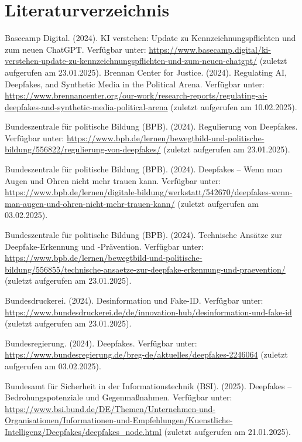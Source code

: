 \documentclass[a4paper,12pt]{article}
\begin{document}
\section*{Literaturverzeichnis}
\begin{thebibliography}{99}
 Basecamp Digital. (2024). KI verstehen: Update zu Kennzeichnungspflichten und zum neuen ChatGPT.
Verfügbar unter: \url{https://www.basecamp.digital/ki-verstehen-update-zu-kennzeichnungspflichten-und-zum-neuen-chatgpt/} (zuletzt aufgerufen am 23.01.2025).
 Brennan Center for Justice. (2024). Regulating AI, Deepfakes, and Synthetic Media in the Political Arena.  
Verfügbar unter: \url{https://www.brennancenter.org/our-work/research-reports/regulating-ai-deepfakes-and-synthetic-media-political-arena} (zuletzt aufgerufen am 10.02.2025).

 Bundeszentrale für politische Bildung (BPB). (2024). Regulierung von Deepfakes. 
Verfügbar unter: \url{https://www.bpb.de/lernen/bewegtbild-und-politische-bildung/556822/regulierung-von-deepfakes/} (zuletzt aufgerufen am 23.01.2025).

 Bundeszentrale für politische Bildung (BPB). (2024). Deepfakes – Wenn man Augen und Ohren nicht mehr trauen kann. 
Verfügbar unter: \url{https://www.bpb.de/lernen/digitale-bildung/werkstatt/542670/deepfakes-wenn-man-augen-und-ohren-nicht-mehr-trauen-kann/} (zuletzt aufgerufen am 03.02.2025).

 Bundeszentrale für politische Bildung (BPB). (2024). Technische Ansätze zur Deepfake-Erkennung und -Prävention. 
Verfügbar unter: \url{https://www.bpb.de/lernen/bewegtbild-und-politische-bildung/556855/technische-ansaetze-zur-deepfake-erkennung-und-praevention/} (zuletzt aufgerufen am 23.01.2025).

 Bundesdruckerei. (2024). Desinformation und Fake-ID. 
Verfügbar unter: \url{https://www.bundesdruckerei.de/de/innovation-hub/desinformation-und-fake-id} (zuletzt aufgerufen am 23.01.2025).

 Bundesregierung. (2024). Deepfakes. 
Verfügbar unter: \url{https://www.bundesregierung.de/breg-de/aktuelles/deepfakes-2246064} (zuletzt aufgerufen am 03.02.2025).

 Bundesamt für Sicherheit in der Informationstechnik (BSI). (2025). Deepfakes – Bedrohungspotenziale und Gegenmaßnahmen. 
Verfügbar unter: \url{https://www.bsi.bund.de/DE/Themen/Unternehmen-und-Organisationen/Informationen-und-Empfehlungen/Kuenstliche-Intelligenz/Deepfakes/deepfakes_node.html} (zuletzt aufgerufen am 21.01.2025).


\end{thebibliography}
\end{document}
